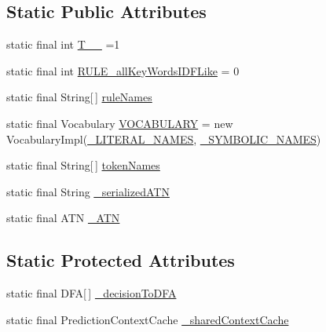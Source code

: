\subsection*{Static Public Attributes}
\begin{DoxyCompactItemize}
\item 
static final int \hyperlink{classgov_1_1nasa_1_1jpf_1_1inspector_1_1server_1_1expression_1_1parser_1_1_expression_grammar_parser_ab0a310bb11915e0b57fa255ecfd30de9}{T\+\_\+\+\_} =1
\item 
static final int \hyperlink{classgov_1_1nasa_1_1jpf_1_1inspector_1_1server_1_1expression_1_1parser_1_1_expression_grammar_parser_af05ef7faad81baf934604beebec77f18}{R\+U\+L\+E\+\_\+all\+Key\+Words\+I\+D\+F\+Like} = 0
\item 
static final String\mbox{[}$\,$\mbox{]} \hyperlink{classgov_1_1nasa_1_1jpf_1_1inspector_1_1server_1_1expression_1_1parser_1_1_expression_grammar_parser_a0591b60da1295151f737fcba5558f1a8}{rule\+Names}
\item 
static final Vocabulary \hyperlink{classgov_1_1nasa_1_1jpf_1_1inspector_1_1server_1_1expression_1_1parser_1_1_expression_grammar_parser_a0d75d95fc62c9d67d9b9e8a82ddbbc7a}{V\+O\+C\+A\+B\+U\+L\+A\+RY} = new Vocabulary\+Impl(\hyperlink{classgov_1_1nasa_1_1jpf_1_1inspector_1_1server_1_1expression_1_1parser_1_1_expression_grammar_parser_a6ecbb9f236329eb444c93090a3c66e66}{\+\_\+\+L\+I\+T\+E\+R\+A\+L\+\_\+\+N\+A\+M\+ES}, \hyperlink{classgov_1_1nasa_1_1jpf_1_1inspector_1_1server_1_1expression_1_1parser_1_1_expression_grammar_parser_a9eda66b9734ba96aa3bb44d7b5f09987}{\+\_\+\+S\+Y\+M\+B\+O\+L\+I\+C\+\_\+\+N\+A\+M\+ES})
\item 
static final String\mbox{[}$\,$\mbox{]} \hyperlink{classgov_1_1nasa_1_1jpf_1_1inspector_1_1server_1_1expression_1_1parser_1_1_expression_grammar_parser_a8ac9c984f8ea713cacd30e5b839aee93}{token\+Names}
\item 
static final String \hyperlink{classgov_1_1nasa_1_1jpf_1_1inspector_1_1server_1_1expression_1_1parser_1_1_expression_grammar_parser_aca4f67b078dbf8602bbf5361d56f3124}{\+\_\+serialized\+A\+TN}
\item 
static final A\+TN \hyperlink{classgov_1_1nasa_1_1jpf_1_1inspector_1_1server_1_1expression_1_1parser_1_1_expression_grammar_parser_acbfca7b6a47fa06a43ac7c24a3e25b6b}{\+\_\+\+A\+TN}
\end{DoxyCompactItemize}
\subsection*{Static Protected Attributes}
\begin{DoxyCompactItemize}
\item 
static final D\+FA\mbox{[}$\,$\mbox{]} \hyperlink{classgov_1_1nasa_1_1jpf_1_1inspector_1_1server_1_1expression_1_1parser_1_1_expression_grammar_parser_affc2287bbadc1a8ed9ad3b8e5018a663}{\+\_\+decision\+To\+D\+FA}
\item 
static final Prediction\+Context\+Cache \hyperlink{classgov_1_1nasa_1_1jpf_1_1inspector_1_1server_1_1expression_1_1parser_1_1_expression_grammar_parser_aca4eca147cfadf1dd3299bdbbb461a4e}{\+\_\+shared\+Context\+Cache}
\end{DoxyCompactItemize}
